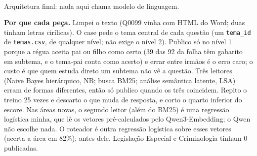 \documentclass[12pt]{article}
\newcommand{\cod}[1]{\texttt{\small #1}}
\begin{document}
\begin{center}
\\[1mm]
{\small Arquitetura final: nada aqui chama modelo de linguagem.}
\end{center}

\textbf{Por que cada peça.} Limpei o texto (Q0099 vinha com HTML do Word; duas tinham letras cirílicas). O case pede o tema central de cada questão (um \cod{tema\_id} de \cod{temas.csv}, de qualquer nível; não exige o nível 2). Publico só no nível 1 porque a régua aceita pai ou filho como certo (39 das 92 da folha têm gabarito em subtema, e o tema-pai conta como acerto) e errar entre irmãos é o erro caro; o custo é que quem estuda direto um subtema não vê a questão. Três leitores (Naive Bayes hierárquico, NB; busca BM25; análise semântica latente, LSA) erram de formas diferentes, então só publico quando os três coincidem. Repito o treino 25 vezes e descarto o que muda de resposta, e corto o quarto inferior do escore. Nas áreas novas, o segundo leitor (além do BM25) é uma regressão logística minha, que lê os vetores pré-calculados pelo Qwen3-Embedding; o Qwen não escolhe nada. O roteador é outra regressão logística sobre esses vetores (acerta a área em 82\%); antes dele, Legislação Especial e Criminologia tinham 0 publicadas.
\end{document}
